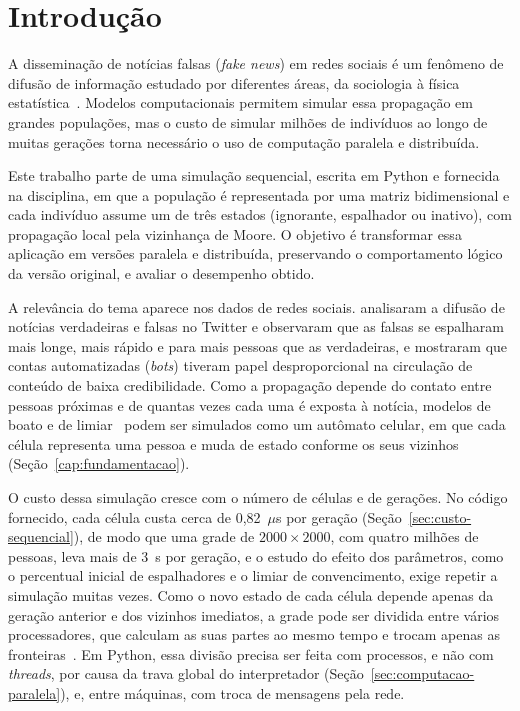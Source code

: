 
\chapter{Introdução}\label{cap:introducao}

A disseminação de notícias falsas (\textit{fake news}) em redes sociais é um fenômeno de difusão de informação estudado por diferentes áreas, da sociologia à física estatística~\cite{Vosoughi2018}. Modelos computacionais permitem simular essa propagação em grandes populações, mas o custo de simular milhões de indivíduos ao longo de muitas gerações torna necessário o uso de computação paralela e distribuída.

Este trabalho parte de uma simulação sequencial, escrita em Python e fornecida na disciplina, em que a população é representada por uma matriz bidimensional e cada indivíduo assume um de três estados (ignorante, espalhador ou inativo), com propagação local pela vizinhança de Moore. O objetivo é transformar essa aplicação em versões paralela e distribuída, preservando o comportamento lógico da versão original, e avaliar o desempenho obtido.

A relevância do tema aparece nos dados de redes sociais.  analisaram a difusão de notícias verdadeiras e falsas no Twitter e observaram que as falsas se espalharam mais longe, mais rápido e para mais pessoas que as verdadeiras, e  mostraram que contas automatizadas (\textit{bots}) tiveram papel desproporcional na circulação de conteúdo de baixa credibilidade. Como a propagação depende do contato entre pessoas próximas e de quantas vezes cada uma é exposta à notícia, modelos de boato e de limiar~\cite{DaleyKendall1964,Granovetter1978} podem ser simulados como um autômato celular, em que cada célula representa uma pessoa e muda de estado conforme os seus vizinhos (Seção~\ref{cap:fundamentacao}).

O custo dessa simulação cresce com o número de células e de gerações. No código fornecido, cada célula custa cerca de 0,82~$\mu$s por geração (Seção~\ref{sec:custo-sequencial}), de modo que uma grade de $2000 \times 2000$, com quatro milhões de pessoas, leva mais de 3~s por geração, e o estudo do efeito dos parâmetros, como o percentual inicial de espalhadores e o limiar de convencimento, exige repetir a simulação muitas vezes. Como o novo estado de cada célula depende apenas da geração anterior e dos vizinhos imediatos, a grade pode ser dividida entre vários processadores, que calculam as suas partes ao mesmo tempo e trocam apenas as fronteiras~\cite{Foster1995}. Em Python, essa divisão precisa ser feita com processos, e não com \textit{threads}, por causa da trava global do interpretador (Seção~\ref{sec:computacao-paralela}), e, entre máquinas, com troca de mensagens pela rede.


